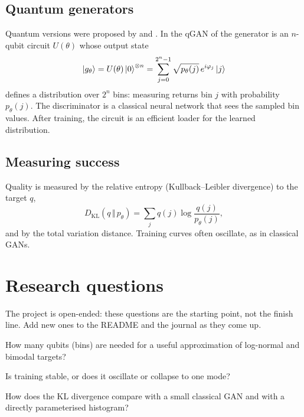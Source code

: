 \documentclass[11pt,a4paper]{article}
\begin{document}
\subsection{Quantum generators}
Quantum versions were proposed by \citet{lloyd2018qgan} and \citet{dallairedemers2018}. In the qGAN of
\citet{zoufal2019} the generator is an $n$-qubit circuit $U(\theta)$ whose output state
\begin{equation}
  \ket{g_\theta}=U(\theta)\ket{0}^{\otimes n}=\sum_{j=0}^{2^n-1}\sqrt{p_\theta(j)}\,e^{i\varphi_j}\ket{j}
\end{equation}
defines a distribution over $2^n$ bins: measuring returns bin $j$ with probability $p_\theta(j)$. The
discriminator is a classical neural network that sees the sampled bin values. After training, the
circuit is an efficient loader for the learned distribution.

\subsection{Measuring success}
Quality is measured by the relative entropy (Kullback--Leibler divergence) to the target $q$,
\begin{equation}
  D_{\mathrm{KL}}(q\,\Vert\,p_\theta)=\sum_jq(j)\log\frac{q(j)}{p_\theta(j)},
\end{equation}
and by the total variation distance. Training curves often oscillate, as in classical GANs.

\section{Research questions}
The project is open-ended: these questions are the starting point, not the finish line. Add new
ones to the README and the journal as they come up.

\begin{rqlist}
  \item How many qubits (bins) are needed for a useful approximation of log-normal and bimodal targets?
  \item Is training stable, or does it oscillate or collapse to one mode?
  \item How does the KL divergence compare with a small classical GAN and with a directly parameterised histogram?
\end{rqlist}
\end{document}
